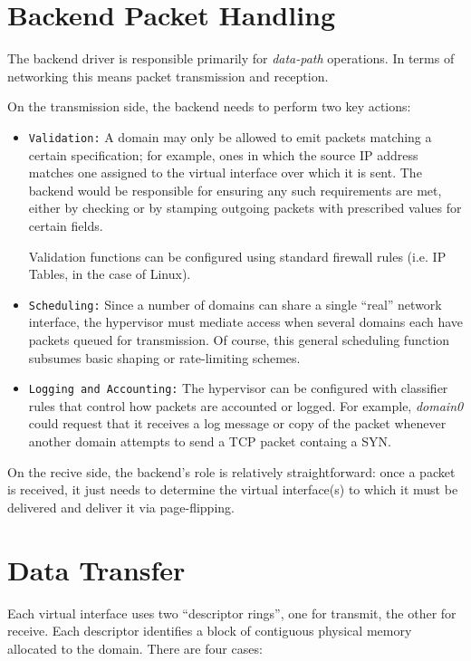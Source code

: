 \documentclass[11pt,twoside,final,openright]{xenstyle}
\begin{document}
\section{Backend Packet Handling}
The backend driver is responsible primarily for {\it data-path} operations.
In terms of networking this means packet transmission and reception.

On the transmission side, the backend needs to perform two key actions:
\begin{itemize}
\item {\tt Validation:} A domain may only be allowed to emit packets
matching a certain specification; for example, ones in which the
source IP address matches one assigned to the virtual interface over
which it is sent.  The backend would be responsible for ensuring any
such requirements are met, either by checking or by stamping outgoing
packets with prescribed values for certain fields.

Validation functions can be configured using standard firewall rules
(i.e. IP Tables, in the case of Linux).

\item {\tt Scheduling:} Since a number of domains can share a single
``real'' network interface, the hypervisor must mediate access when
several domains each have packets queued for transmission.  Of course,
this general scheduling function subsumes basic shaping or
rate-limiting schemes.

\item {\tt Logging and Accounting:} The hypervisor can be configured
with classifier rules that control how packets are accounted or
logged.  For example, {\it domain0} could request that it receives a
log message or copy of the packet whenever another domain attempts to
send a TCP packet containg a SYN.
\end{itemize}

On the recive side, the backend's role is relatively straightforward:
once a packet is received, it just needs to determine the virtual interface(s)
to which it must be delivered and deliver it via page-flipping. 


\section{Data Transfer}

Each virtual interface uses two ``descriptor rings'', one for transmit,
the other for receive.  Each descriptor identifies a block of contiguous
physical memory allocated to the domain.  There are four cases:
\end{document}
